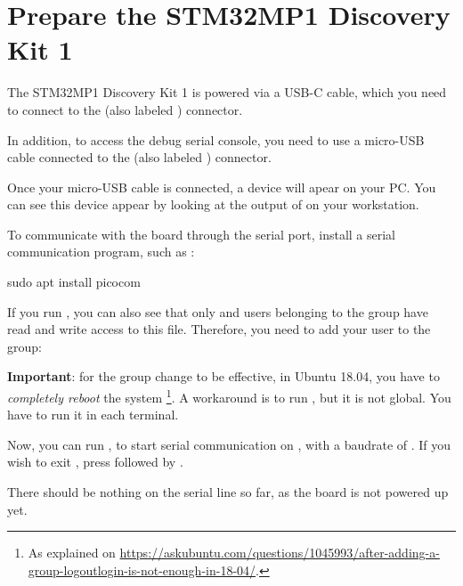 \section{Prepare the STM32MP1 Discovery Kit 1}

The STM32MP1 Discovery Kit 1 is powered via a USB-C cable, which you
need to connect to the  (also labeled )
connector.

In addition, to access the debug serial console, you need to use a
micro-USB cable connected to the  (also labeled
) connector.

Once your micro-USB cable is connected, a  device
will apear on your PC. You can see this device appear by looking at
the output of  on your workstation.

To communicate with the board through the serial port, install a
serial communication program, such as :

\begin{bashinput}
sudo apt install picocom
\end{bashinput}

If you run , you can also see that only
 and users belonging to the  group have read
and write access to this file. Therefore, you need to add your user to
the  group:


{\bf Important}: for the group change to be effective, in Ubuntu 18.04, you have to
{\em completely reboot} the system \footnote{As explained on
\url{https://askubuntu.com/questions/1045993/after-adding-a-group-logoutlogin-is-not-enough-in-18-04/}.}.
A workaround is to run , but it is not global.
You have to run it in each terminal.

Now, you can run , to start
serial communication on , with a baudrate of
. If you wish to exit , press
\code{[Ctrl][a]} followed by \code{[Ctrl][x]}.

There should be nothing on the serial line so far, as the board is not
powered up yet.
